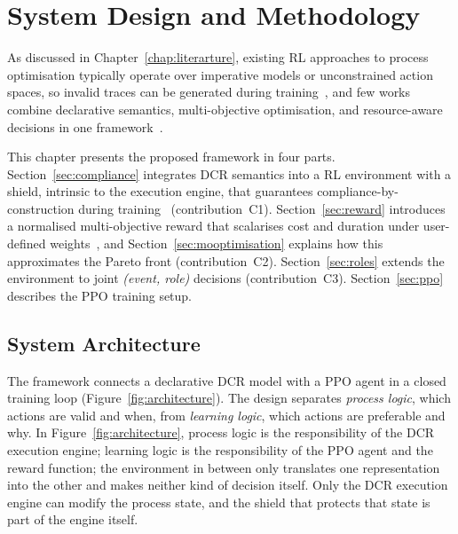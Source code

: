 
\chapter{System Design and Methodology}
\label{chap:method}


As discussed in Chapter~\ref{chap:literarture}, existing \ac{RL}
approaches to process optimisation typically operate over imperative
models or unconstrained action spaces, so invalid traces can be
generated during training~\cite{Huang2011ReinforcementManagement,
Kubrak2021PrescriptiveVadis}, and few works combine declarative
semantics, multi-objective optimisation, and resource-aware decisions
in one framework~\cite{Diaz2024Pareto-OptimalModels,
KirchdorferLukasFromPolicies, Odriozola-Olalde2025TowardsFramework}.


This chapter presents the proposed framework in four parts.
Section~\ref{sec:compliance} integrates \ac{DCR} semantics into a
\ac{RL} environment with a shield, intrinsic to the execution engine,
that guarantees compliance-by-construction during
training~\cite{Alshiekh2017SafeShielding} (contribution~C1).
Section~\ref{sec:reward} introduces a normalised
multi-objective reward that scalarises cost and duration under
user-defined weights~\cite{Roijers2013ADecision-Making}, and
Section~\ref{sec:mooptimisation} explains how this approximates the
Pareto front (contribution~C2). Section~\ref{sec:roles} extends the
environment to joint \textit{(event, role)} decisions
(contribution~C3). Section~\ref{sec:ppo} describes the \ac{PPO}
training setup.

\section{System Architecture}
\label{sec:architecture}

The framework connects a declarative \ac{DCR} model with a \ac{PPO}
agent in a closed training loop (Figure~\ref{fig:architecture}). The
design separates \emph{process logic}, which actions are valid and
when, from \emph{learning logic}, which actions are preferable and
why. In Figure~\ref{fig:architecture}, process logic is the
responsibility of the \ac{DCR} execution engine; learning logic is the
responsibility of the \ac{PPO} agent and the reward function; the
environment in between only translates one representation into the
other and makes neither kind of decision itself. Only the \ac{DCR}
execution engine can modify the process state, and the shield that
protects that state is part of the engine itself.


